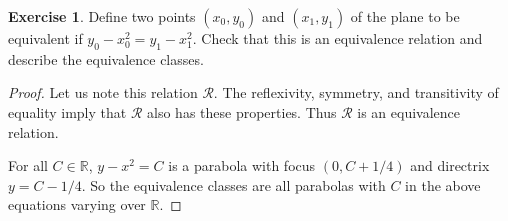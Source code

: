 \documentclass[11pt,a4paper,twoside]{article}
\theoremstyle{definition}
\newcounter{excounter}
\newtheorem{exercise}[excounter]{Exercise}
\begin{document}
\begin{exercise}

  Define two points $(x_0, y_0)$ and $(x_1, y_1)$ of the plane to be equivalent if $y_0 - x_0^2 = y_1 - x_1^2$.
  Check that this is an equivalence relation and describe the equivalence classes.

\end{exercise}

\begin{proof}\hfill

  Let us note this relation $\mathscr{R}$.
  The reflexivity, symmetry, and transitivity of equality imply that $\mathscr{R}$ also has these properties.
  Thus $\mathscr{R}$ is an equivalence relation.

  For all $C \in \mathbb{R}$, $y - x^2 = C$ is a parabola with focus $(0, C + 1 / 4)$ and directrix $y = C - 1 / 4$.
  So the equivalence classes are all parabolas with $C$ in the above equations varying over $\mathbb{R}$.

\end{proof}
\end{document}
